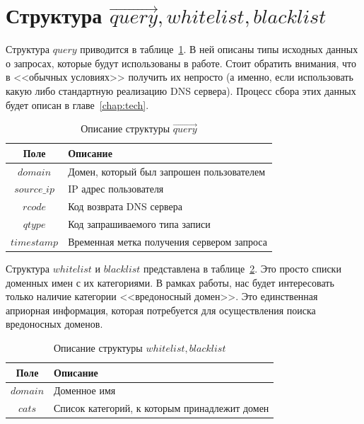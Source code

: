 \documentclass[a4paper,14pt]{extreport} %
\begin{document}
\section{Структура $\vec{query}, whitelist, blacklist$}
Структура $query$ приводится в таблице~\ref{tab:ql}. В ней описаны типы исходных данных о запросах, которые будут использованы в работе. Стоит обратить внимания, что в <<обычных условиях>> получить их непросто (а именно, если использовать какую либо стандартную реализацию DNS сервера). Процесс сбора этих данных будет описан в главе~\ref{chap:tech}.
\label{sec:strq}
\begin{table}[H]
\centering
\caption{Описание структуры $\vec{query}$}\label{tab:ql}
\begin{tabular}{| c | l |}
	\hline
	Поле     & Описание                                                                 \\ \hline
	$domain$     & Домен, который был запрошен пользователем    \\ \hline 
	$source\_ip$ & IP адрес пользователя                                           \\ \hline
	$rcode$      & Код возврата DNS сервера                                       \\ \hline
	$qtype$      & Код запрашиваемого типа записи                        \\ \hline
	$timestamp$  & Временная метка получения сервером запроса \\ \hline
		
\end{tabular}
\end{table}


Структура $whitelist$ и $blacklist$ представлена в таблице~\ref{tab:bw}. Это просто списки доменных имен с их категориями. В рамках работы, нас будет интересовать только наличие категории <<вредоносный домен>>. Это единственная априорная информация, которая потребуется для осуществления поиска вредоносных доменов.
\begin{table}[H]
\centering
\caption{Описание структуры $whitelist, blacklist$}\label{tab:bw}
\begin{tabular}{| c | l |}
	\hline
	Поле & Описание                                                                    \\ \hline
	$domain$ & Доменное имя                                                             \\ \hline 
	$cats$   & Список категорий, к которым принадлежит домен \\ \hline
		
\end{tabular}
\end{table}
\end{document}
